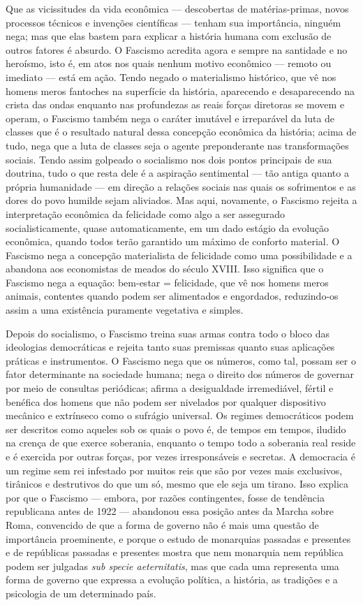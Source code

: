 \documentclass[12pt]{article}
\begin{document}
Que as vicissitudes da vida econômica — descobertas de matérias-primas, novos processos técnicos e invenções científicas — tenham sua importância, ninguém nega; mas que elas bastem para explicar a história humana com exclusão de outros fatores é absurdo. O Fascismo acredita agora e sempre na santidade e no heroísmo, isto é, em atos nos quais nenhum motivo econômico — remoto ou imediato — está em ação. Tendo negado o materialismo histórico, que vê nos homens meros fantoches na superfície da história, aparecendo e desaparecendo na crista das ondas enquanto nas profundezas as reais forças diretoras se movem e operam, o Fascismo também nega o caráter imutável e irreparável da luta de classes que é o resultado natural dessa concepção econômica da história; acima de tudo, nega que a luta de classes seja o agente preponderante nas transformações sociais. Tendo assim golpeado o socialismo nos dois pontos principais de sua doutrina, tudo o que resta dele é a aspiração sentimental — tão antiga quanto a própria humanidade — em direção a relações sociais nas quais os sofrimentos e as dores do povo humilde sejam aliviados. Mas aqui, novamente, o Fascismo rejeita a interpretação econômica da felicidade como algo a ser assegurado socialisticamente, quase automaticamente, em um dado estágio da evolução econômica, quando todos terão garantido um máximo de conforto material. O Fascismo nega a concepção materialista de felicidade como uma possibilidade e a abandona aos economistas de meados do século XVIII. Isso significa que o Fascismo nega a equação: bem-estar = felicidade, que vê nos homens meros animais, contentes quando podem ser alimentados e engordados, reduzindo-os assim a uma existência puramente vegetativa e simples.

Depois do socialismo, o Fascismo treina suas armas contra todo o bloco das ideologias democráticas e rejeita tanto suas premissas quanto suas aplicações práticas e instrumentos. O Fascismo nega que os números, como tal, possam ser o fator determinante na sociedade humana; nega o direito dos números de governar por meio de consultas periódicas; afirma a desigualdade irremediável, fértil e benéfica dos homens que não podem ser nivelados por qualquer dispositivo mecânico e extrínseco como o sufrágio universal. Os regimes democráticos podem ser descritos como aqueles sob os quais o povo é, de tempos em tempos, iludido na crença de que exerce soberania, enquanto o tempo todo a soberania real reside e é exercida por outras forças, por vezes irresponsáveis e secretas. A democracia é um regime sem rei infestado por muitos reis que são por vezes mais exclusivos, tirânicos e destrutivos do que um só, mesmo que ele seja um tirano. Isso explica por que o Fascismo — embora, por razões contingentes, fosse de tendência republicana antes de 1922 — abandonou essa posição antes da Marcha sobre Roma, convencido de que a forma de governo não é mais uma questão de importância proeminente, e porque o estudo de monarquias passadas e presentes e de repúblicas passadas e presentes mostra que nem monarquia nem república podem ser julgadas \textit{sub specie aeternitatis}, mas que cada uma representa uma forma de governo que expressa a evolução política, a história, as tradições e a psicologia de um determinado país.
\end{document}
